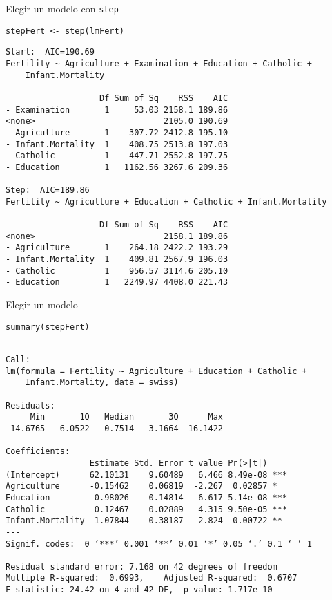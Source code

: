 \documentclass[xcolor={usenames,svgnames,dvipsnames}]{beamer}
\begin{document}
\begin{frame}[fragile,label={sec:org3f4d00c}]{Elegir un modelo con \texttt{step}}
 \lstset{language=r,label= ,caption= ,captionpos=b,numbers=none}
\begin{lstlisting}
stepFert <- step(lmFert)
\end{lstlisting}

\begin{verbatim}
Start:  AIC=190.69
Fertility ~ Agriculture + Examination + Education + Catholic + 
    Infant.Mortality

                   Df Sum of Sq    RSS    AIC
- Examination       1     53.03 2158.1 189.86
<none>                          2105.0 190.69
- Agriculture       1    307.72 2412.8 195.10
- Infant.Mortality  1    408.75 2513.8 197.03
- Catholic          1    447.71 2552.8 197.75
- Education         1   1162.56 3267.6 209.36

Step:  AIC=189.86
Fertility ~ Agriculture + Education + Catholic + Infant.Mortality

                   Df Sum of Sq    RSS    AIC
<none>                          2158.1 189.86
- Agriculture       1    264.18 2422.2 193.29
- Infant.Mortality  1    409.81 2567.9 196.03
- Catholic          1    956.57 3114.6 205.10
- Education         1   2249.97 4408.0 221.43
\end{verbatim}
\end{frame}

\begin{frame}[fragile,label={sec:orgc5c0e15}]{Elegir un modelo}
 \lstset{language=r,label= ,caption= ,captionpos=b,numbers=none}
\begin{lstlisting}
summary(stepFert)
\end{lstlisting}

\begin{verbatim}

Call:
lm(formula = Fertility ~ Agriculture + Education + Catholic + 
    Infant.Mortality, data = swiss)

Residuals:
     Min       1Q   Median       3Q      Max 
-14.6765  -6.0522   0.7514   3.1664  16.1422 

Coefficients:
                 Estimate Std. Error t value Pr(>|t|)    
(Intercept)      62.10131    9.60489   6.466 8.49e-08 ***
Agriculture      -0.15462    0.06819  -2.267  0.02857 *  
Education        -0.98026    0.14814  -6.617 5.14e-08 ***
Catholic          0.12467    0.02889   4.315 9.50e-05 ***
Infant.Mortality  1.07844    0.38187   2.824  0.00722 ** 
---
Signif. codes:  0 ‘***’ 0.001 ‘**’ 0.01 ‘*’ 0.05 ‘.’ 0.1 ‘ ’ 1

Residual standard error: 7.168 on 42 degrees of freedom
Multiple R-squared:  0.6993,	Adjusted R-squared:  0.6707 
F-statistic: 24.42 on 4 and 42 DF,  p-value: 1.717e-10
\end{verbatim}
\end{frame}
\end{document}
